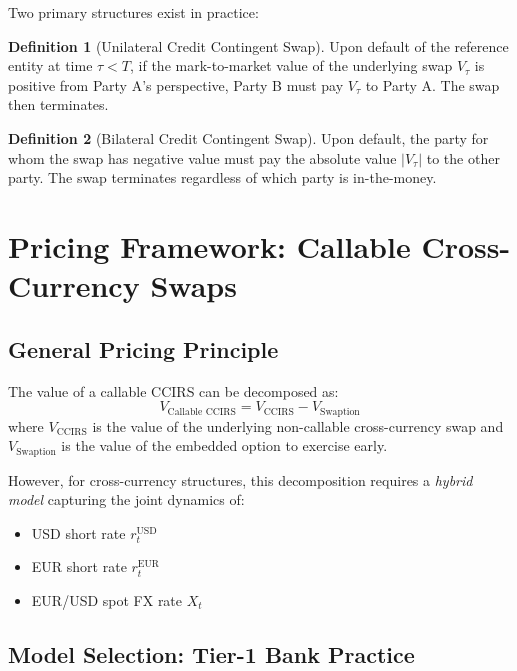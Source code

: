 \documentclass[conference]{IEEEtran}
\theoremstyle{definition}
\newtheorem{definition}{Definition}[section]
\begin{document}
Two primary structures exist in practice:

\begin{definition}[Unilateral Credit Contingent Swap]
Upon default of the reference entity at time $\tau < T$, if the mark-to-market value of the underlying swap $V_{\tau}$ is positive from Party A's perspective, Party B must pay $V_{\tau}$ to Party A. The swap then terminates.
\end{definition}

\begin{definition}[Bilateral Credit Contingent Swap]
Upon default, the party for whom the swap has negative value must pay the absolute value $|V_{\tau}|$ to the other party. The swap terminates regardless of which party is in-the-money.
\end{definition}

\section{Pricing Framework: Callable Cross-Currency Swaps}

\subsection{General Pricing Principle}

The value of a callable CCIRS can be decomposed as:
\begin{equation}
V_{\text{Callable CCIRS}} = V_{\text{CCIRS}} - V_{\text{Swaption}}
\end{equation}
where $V_{\text{CCIRS}}$ is the value of the underlying non-callable cross-currency swap and $V_{\text{Swaption}}$ is the value of the embedded option to exercise early.

However, for cross-currency structures, this decomposition requires a \textit{hybrid model} capturing the joint dynamics of:
\begin{itemize}
    \item USD short rate $r^{\text{USD}}_t$
    \item EUR short rate $r^{\text{EUR}}_t$
    \item EUR/USD spot FX rate $X_t$
\end{itemize}

\subsection{Model Selection: Tier-1 Bank Practice}
\end{document}
